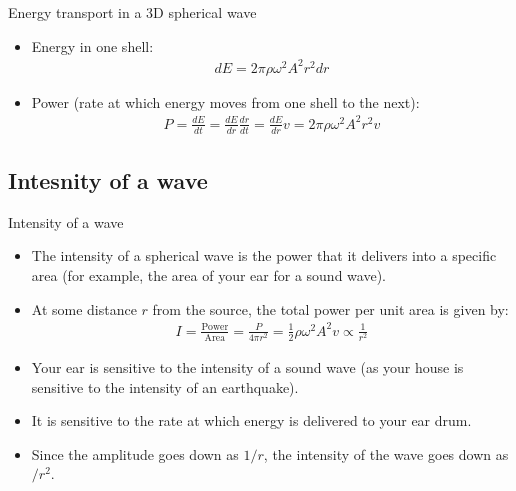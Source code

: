 \documentclass[aspectratio=169,
hyperref={colorlinks,urlcolor=blue}
]{beamer}
\begin{document}
\begin{frame}{Energy transport in a 3D spherical wave}
\begin{itemize}
\item Energy in one shell:
\begin{align*}
dE= 2\pi\rho\omega^2A^2r^2dr
\end{align*}
\item Power (rate at which energy moves from one shell to the next):
\begin{align*}
P=\frac{dE}{dt}=\frac{dE}{dr}\frac{dr}{dt}=\frac{dE}{dr}v= 2\pi\rho\omega^2A^2r^2v
\end{align*}
\end{itemize}
\end{frame}




\subsection{Intesnity of a wave}
\label{subsec:intensityofawave}
\begin{frame}{Intensity of a wave}
\begin{itemize}
\item The intensity of a spherical wave is the power that it delivers into a specific area (for example, the area of your ear for a sound wave).
\item At some distance $r$ from the source, the total power per unit area is given by:
\begin{align*}
I=\frac{\text{Power}}{\text{Area}}=\frac{P}{4\pi r^2}=\frac{1}{2}\rho \omega^2A^2v\propto \frac{1}{r^2}
\end{align*}
\item Your ear is sensitive to the intensity of a sound wave (as your house is sensitive to the intensity of an earthquake). \item It is sensitive to the rate at which energy is delivered to your ear drum. 
\item Since the amplitude goes down as $1/r$, the intensity of the wave goes down as $/r^2$.  
\end{itemize}
\end{frame}





\end{document}
